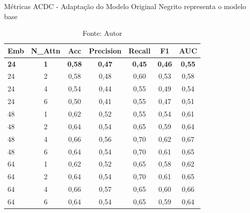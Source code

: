 \begin{table}[htbp]
\centering
\caption{Métricas ACDC - Adaptação do Modelo Original
\newline Negrito representa o modelo base}
\begin{tabular}{lcccccc}
\toprule
\textbf{Emb} & \textbf{N\_Attn} & \textbf{Acc} & \textbf{Precision} & \textbf{Recall} & \textbf{F1} & \textbf{AUC} \\
\midrule
\textbf{24} & \textbf{1} & \textbf{0,58} & \textbf{0,47} & \textbf{0,45} & \textbf{0,46} & \textbf{0,55} \\
24 & 2 & 0,58 & 0,48 & 0,60 & 0,53 & 0,58 \\
24 & 4 & 0,54 & 0,44 & 0,55 & 0,49 & 0,54 \\
24 & 6 & 0,50 & 0,41 & 0,55 & 0,47 & 0,51 \\
\hline
48 & 1 & 0,62 & 0,52 & 0,55 & 0,54 & 0,61 \\
48 & 2 & 0,64 & 0,54 & 0,65 & 0,59 & 0,64 \\
48 & 4 & 0,66 & 0,56 & 0,70 & 0,62 & 0,67 \\
48 & 6 & 0,64 & 0,54 & 0,70 & 0,61 & 0,65 \\
\hline
64 & 1 & 0,62 & 0,52 & 0,65 & 0,58 & 0,62 \\
64 & 2 & 0,64 & 0,54 & 0,70 & 0,61 & 0,65 \\
64 & 4 & 0,66 & 0,57 & 0,65 & 0,60 & 0,66 \\
64 & 6 & 0,64 & 0,54 & 0,65 & 0,59 & 0,64 \\
\bottomrule
\end{tabular}
\caption*{Fonte: Autor}
\label{tab:metrics_acdc_orig}
\end{table}


